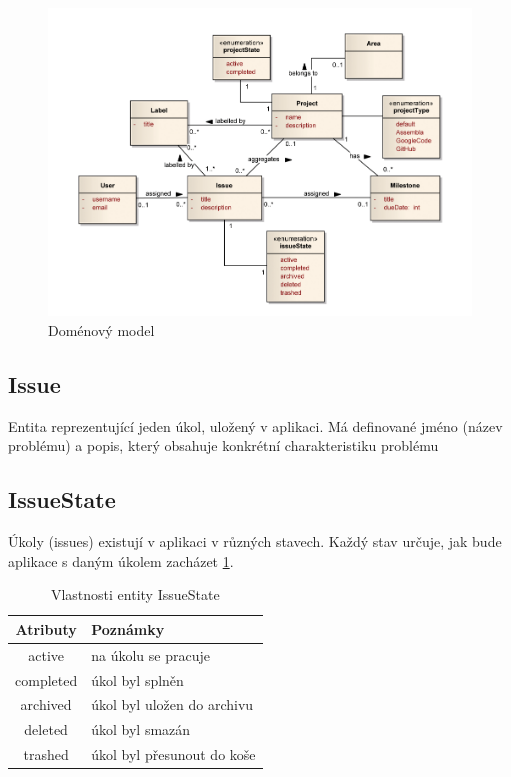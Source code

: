 \begin{figure}[h]
	\includegraphics[keepaspectratio,width=16cm]{figures/domain-model}
	\caption{Doménový model}
	\label{fig:domain-model}
\end{figure}

\subsection{Issue}
Entita reprezentující jeden úkol, uložený v aplikaci. Má definované jméno (název problému) a popis, který obsahuje konkrétní charakteristiku problému

\subsection{IssueState}
Úkoly (issues) existují v aplikaci v různých stavech. Každý stav určuje, jak bude aplikace s daným úkolem zacházet \ref{tab:issueState}.

\begin{table}[h]
\begin{center}
	\begin{tabular}{|c|l|}
	\hline
	Atributy & Poznámky \\
	\hline
	active & na úkolu se pracuje \\
	completed & úkol byl splněn \\
	archived & úkol byl uložen do archivu \\
	deleted & úkol byl smazán \\
	trashed & úkol byl přesunout do koše \\
	\hline
	\end{tabular}
\end{center}
\caption{Vlastnosti entity IssueState}
\label{tab:issueState}
\end{table}

